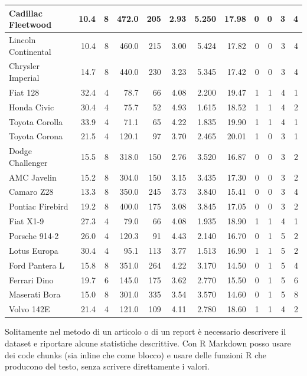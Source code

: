 \documentclass[
]{article}
\begin{document}
\begin{table}
\begin{tabular}[t]{l|r|r|r|r|r|r|r|r|r|r|r}
\hline
Cadillac Fleetwood & 10.4 & 8 & 472.0 & 205 & 2.93 & 5.250 & 17.98 & 0 & 0 & 3 & 4\\
\hline
Lincoln Continental & 10.4 & 8 & 460.0 & 215 & 3.00 & 5.424 & 17.82 & 0 & 0 & 3 & 4\\
\hline
Chrysler Imperial & 14.7 & 8 & 440.0 & 230 & 3.23 & 5.345 & 17.42 & 0 & 0 & 3 & 4\\
\hline
Fiat 128 & 32.4 & 4 & 78.7 & 66 & 4.08 & 2.200 & 19.47 & 1 & 1 & 4 & 1\\
\hline
Honda Civic & 30.4 & 4 & 75.7 & 52 & 4.93 & 1.615 & 18.52 & 1 & 1 & 4 & 2\\
\hline
Toyota Corolla & 33.9 & 4 & 71.1 & 65 & 4.22 & 1.835 & 19.90 & 1 & 1 & 4 & 1\\
\hline
Toyota Corona & 21.5 & 4 & 120.1 & 97 & 3.70 & 2.465 & 20.01 & 1 & 0 & 3 & 1\\
\hline
Dodge Challenger & 15.5 & 8 & 318.0 & 150 & 2.76 & 3.520 & 16.87 & 0 & 0 & 3 & 2\\
\hline
AMC Javelin & 15.2 & 8 & 304.0 & 150 & 3.15 & 3.435 & 17.30 & 0 & 0 & 3 & 2\\
\hline
Camaro Z28 & 13.3 & 8 & 350.0 & 245 & 3.73 & 3.840 & 15.41 & 0 & 0 & 3 & 4\\
\hline
Pontiac Firebird & 19.2 & 8 & 400.0 & 175 & 3.08 & 3.845 & 17.05 & 0 & 0 & 3 & 2\\
\hline
Fiat X1-9 & 27.3 & 4 & 79.0 & 66 & 4.08 & 1.935 & 18.90 & 1 & 1 & 4 & 1\\
\hline
Porsche 914-2 & 26.0 & 4 & 120.3 & 91 & 4.43 & 2.140 & 16.70 & 0 & 1 & 5 & 2\\
\hline
Lotus Europa & 30.4 & 4 & 95.1 & 113 & 3.77 & 1.513 & 16.90 & 1 & 1 & 5 & 2\\
\hline
Ford Pantera L & 15.8 & 8 & 351.0 & 264 & 4.22 & 3.170 & 14.50 & 0 & 1 & 5 & 4\\
\hline
Ferrari Dino & 19.7 & 6 & 145.0 & 175 & 3.62 & 2.770 & 15.50 & 0 & 1 & 5 & 6\\
\hline
Maserati Bora & 15.0 & 8 & 301.0 & 335 & 3.54 & 3.570 & 14.60 & 0 & 1 & 5 & 8\\
\hline
Volvo 142E & 21.4 & 4 & 121.0 & 109 & 4.11 & 2.780 & 18.60 & 1 & 1 & 4 & 2\\
\hline
\end{tabular}
\end{table}

Solitamente nel metodo di un articolo o di un report è necessario descrivere il dataset e riportare alcune statistiche descrittive. Con R Markdown posso usare dei code chunks (sia inline che come blocco) e usare delle funzioni R che producono del testo, senza scrivere direttamente i valori.
\end{document}
